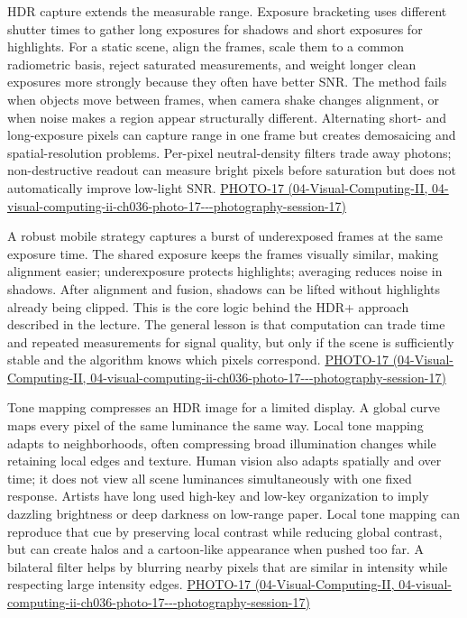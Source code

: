 HDR capture extends the measurable range. Exposure bracketing uses different shutter times to gather long exposures for shadows and short exposures for highlights. For a static scene, align the frames, scale them to a common radiometric basis, reject saturated measurements, and weight longer clean exposures more strongly because they often have better SNR. The method fails when objects move between frames, when camera shake changes alignment, or when noise makes a region appear structurally different. Alternating short- and long-exposure pixels can capture range in one frame but creates demosaicing and spatial-resolution problems. Per-pixel neutral-density filters trade away photons; non-destructive readout can measure bright pixels before saturation but does not automatically improve low-light SNR. \href{../04-Visual-Computing-II/main.pdf\#nameddest=04-visual-computing-ii-ch036-photo-17---photography-session-17}{PHOTO-17 (04-Visual-Computing-II, 04-visual-computing-ii-ch036-photo-17-\/-\/-photography-session-17)}

A robust mobile strategy captures a burst of underexposed frames at the same exposure time. The shared exposure keeps the frames visually similar, making alignment easier; underexposure protects highlights; averaging reduces noise in shadows. After alignment and fusion, shadows can be lifted without highlights already being clipped. This is the core logic behind the HDR+ approach described in the lecture. The general lesson is that computation can trade time and repeated measurements for signal quality, but only if the scene is sufficiently stable and the algorithm knows which pixels correspond. \href{../04-Visual-Computing-II/main.pdf\#nameddest=04-visual-computing-ii-ch036-photo-17---photography-session-17}{PHOTO-17 (04-Visual-Computing-II, 04-visual-computing-ii-ch036-photo-17-\/-\/-photography-session-17)}

Tone mapping compresses an HDR image for a limited display. A global curve maps every pixel of the same luminance the same way. Local tone mapping adapts to neighborhoods, often compressing broad illumination changes while retaining local edges and texture. Human vision also adapts spatially and over time; it does not view all scene luminances simultaneously with one fixed response. Artists have long used high-key and low-key organization to imply dazzling brightness or deep darkness on low-range paper. Local tone mapping can reproduce that cue by preserving local contrast while reducing global contrast, but can create halos and a cartoon-like appearance when pushed too far. A bilateral filter helps by blurring nearby pixels that are similar in intensity while respecting large intensity edges. \href{../04-Visual-Computing-II/main.pdf\#nameddest=04-visual-computing-ii-ch036-photo-17---photography-session-17}{PHOTO-17 (04-Visual-Computing-II, 04-visual-computing-ii-ch036-photo-17-\/-\/-photography-session-17)}

